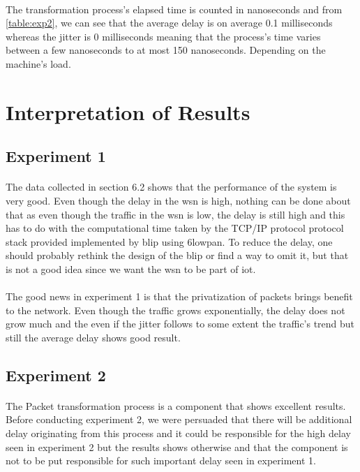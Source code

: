 \documentclass[oneside,12pt,a4paper,final]{book}
\begin{document}
\paragraph{}
The transformation process's elapsed time is counted in nanoseconds and from \ref{table:exp2}, we can see that the average delay is on average 0.1 milliseconds whereas the jitter is 0 milliseconds meaning that the process's time varies between a few nanoseconds to at most 150 nanoseconds. Depending on the machine's load.
\section{Interpretation of Results}
\subsection{Experiment 1}
\paragraph{}
The data collected in section 6.2 shows that the performance of the system is very good. Even though the delay in the \gls{wsn} is high, 
 nothing can be done about that as even though the traffic in the \gls{wsn} is low, the delay is still high and this has to do with the computational time taken by the TCP/IP protocol protocol stack provided implemented by \gls{blip} using \gls{6lowpan}. To reduce the delay, one should probably rethink the design of the \gls{blip} or find a way to omit it, but that is not a good idea since we want the \gls{wsn} to be part of \gls{iot}. 
 \paragraph{}
 The good news in experiment 1 is that the privatization of packets brings benefit to the network. Even though the traffic grows exponentially, the delay does not grow much and the even if the jitter follows to some extent the traffic's trend but still the average delay shows good result. 
 \subsection{Experiment 2}
 \paragraph{}
 The Packet transformation process is a component that shows excellent results. Before conducting experiment 2, we were persuaded that there will be additional delay originating from this process and it could be responsible for the high delay seen in experiment 2 but the results shows otherwise and that the component is not to be put responsible for such important delay seen in experiment 1.
\end{document}
